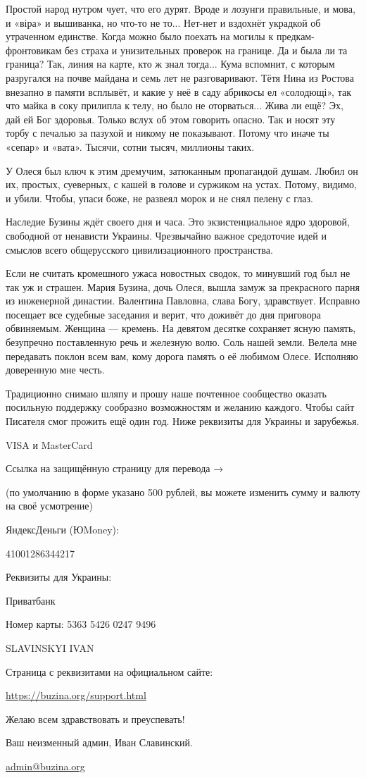Простой народ нутром чует, что его дурят. Вроде и лозунги правильные, и мова, и
«віра» и вышиванка, но что-то не то... Нет-нет и вздохнёт украдкой об утраченном
единстве. Когда можно было поехать на могилы к предкам-фронтовикам без страха и
унизительных проверок на границе. Да и была ли та граница? Так, линия на карте,
кто ж знал тогда... Кума вспомнит, с которым разругался на почве майдана и семь
лет не разговаривают. Тётя Нина из Ростова внезапно в памяти всплывёт, и какие
у неё в саду абрикосы ел «солодющі», так что майка в соку прилипла к телу, но
было не оторваться... Жива ли ещё? Эх, дай ей Бог здоровья. Только вслух об этом
говорить опасно. Так и носят эту торбу с печалью за пазухой и никому не
показывают. Потому что иначе ты «сепар» и «вата». Тысячи, сотни тысяч, миллионы
таких.

У Олеся был ключ к этим дремучим, затюканным пропагандой душам. Любил он их,
простых, суеверных, с кашей в голове и суржиком на устах. Потому, видимо, и
убили. Чтобы, упаси боже, не развеял морок и не снял пелену с глаз.

Наследие Бузины ждёт своего дня и часа. Это экзистенциальное ядро здоровой,
свободной от ненависти Украины. Чрезвычайно важное средоточие идей и смыслов
всего общерусского цивилизационного пространства.

Если не считать кромешного ужаса новостных сводок, то минувший год был не так
уж и страшен. Мария Бузина, дочь Олеся, вышла замуж за прекрасного парня из
инженерной династии. Валентина Павловна, слава Богу, здравствует. Исправно
посещает все судебные заседания и верит, что доживёт до дня приговора
обвиняемым. Женщина — кремень. На девятом десятке сохраняет ясную память,
безупречно поставленную речь и железную волю. Соль нашей земли. Велела мне
передавать поклон всем вам, кому дорога память о её любимом Олесе. Исполняю
доверенную мне честь.

Традиционно снимаю шляпу и прошу наше почтенное сообщество оказать посильную
поддержку сообразно возможностям и желанию каждого. Чтобы сайт Писателя смог
прожить ещё один год. Ниже реквизиты для Украины и зарубежья.

VISA и MasterCard

Ссылка на защищённую страницу для перевода →

(по умолчанию в форме указано 500 рублей, вы можете изменить сумму и валюту на
своё усмотрение)

ЯндексДеньги (ЮMoney):

41001286344217

Реквизиты для Украины:

Приватбанк

Номер карты: 5363 5426 0247 9496

SLAVINSKYI IVAN

Страница с реквизитами на официальном сайте:

\url{https://buzina.org/support.html}

Желаю всем здравствовать и преуспевать!

Ваш неизменный админ, Иван Славинский.

\url{admin@buzina.org}

